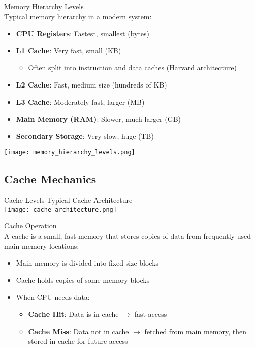 \begin{definition}{Memory Hierarchy Levels}\\
Typical memory hierarchy in a modern system:
\begin{itemize}
    \item \textbf{CPU Registers}: Fastest, smallest (bytes)
    \item \textbf{L1 Cache}: Very fast, small (KB)
    \begin{itemize}
        \item Often split into instruction and data caches (Harvard architecture)
    \end{itemize}
    \item \textbf{L2 Cache}: Fast, medium size (hundreds of KB)
    \item \textbf{L3 Cache}: Moderately fast, larger (MB)
    \item \textbf{Main Memory (RAM)}: Slower, much larger (GB)
    \item \textbf{Secondary Storage}: Very slow, huge (TB)
\end{itemize}
\texttt{[image: memory\_hierarchy\_levels.png]}
\end{definition}

\subsection{Cache Mechanics}

\begin{definition}{Cache Levels} Typical Cache Architecture\\
    \texttt{[image: cache\_architecture.png]}    
\end{definition}

\begin{concept}{Cache Operation}\\
A cache is a small, fast memory that stores copies of data from frequently used main memory locations:
\begin{itemize}
    \item Main memory is divided into fixed-size blocks
    \item Cache holds copies of some memory blocks
    \item When CPU needs data:
    \begin{itemize}
        \item \textbf{Cache Hit}: Data is in cache $\rightarrow$ fast access
        \item \textbf{Cache Miss}: Data not in cache $\rightarrow$ fetched from main memory, then stored in cache for future access
    \end{itemize}
\end{itemize}
\end{concept}

